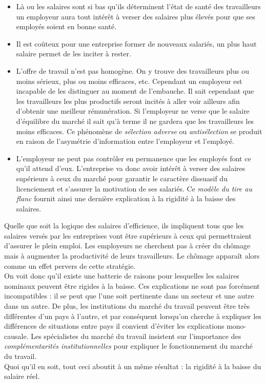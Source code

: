 \documentclass[10pt]{book}
\begin{document}
\begin{itemize}
  \item Là ou les salaires sont si bas qu'ils déterminent l'état de santé des travailleurs un employeur aura tout intérêt à verser des salaires plus élevés pour que ses employés soient en bonne santé.
  \item Il est coûteux pour une entreprise former de nouveaux salariés, un plus haut salaire permet de les inciter à rester.
  \item L'offre de travail n'est pas homogène. On y trouve des travailleurs plus ou moins sérieux, plus ou moins efficaces, etc. Cependant un employeur est incapable de les distinguer au moment de l'embauche. Il sait cependant que les travailleurs les plus productifs seront incités à aller voir ailleurs afin d'obtenir une meilleur rémunération. Si l'employeur ne verse que le salaire d'équilibre du marché il sait qu'à terme il ne gardera que les travailleurs les moins efficaces. Ce phénomène de \textit{sélection adverse} ou \textit{antisélection} se produit en raison de l'asymétrie d'information entre l'employeur et l'employé.
  \item L'employeur ne peut pas contrôler en permanence que les employés font ce qu'il attend d'eux. L'entreprise va donc avoir intérêt à verser des salaires supérieurs à ceux du marché pour garantir le caractère dissuasif du licenciement et s'assurer la motivation de ses salariés. Ce \textit{modèle du tire au flanc} fournit ainsi une dernière explication à la rigidité à la baisse des salaires.
\end{itemize}
Quelle que soit la logique des salaires d'efficience, ils impliquent tous que les salaires versés par les entreprises vont être supérieurs à ceux qui permettraient d'assurer le plein emploi. Les employeurs ne cherchent pas à créer du chômage mais à augmenter la productivité de leurs travailleurs. Le chômage apparaît alors comme un effet pervers de cette stratégie. \\
On voit donc qu'il existe une batterie de raisons pour lesquelles les salaires nominaux peuvent être rigides à la baisse. Ces explications ne sont pas forcément incompatibles : il se peut que l'une soit pertinente dans un secteur et une autre dans un autre. De plus, les institutions du marché du travail peuvent être très différentes d'un pays à l'autre, et par conséquent lorsqu'on cherche à expliquer les différences de situations entre pays il convient d'éviter les explications mono-causale. Les spécialistes du marché du travail insistent sur l'importance des \textit{complémentarités institutionnelles} pour expliquer le fonctionnement du marché du travail. \\
Quoi qu'il en soit, tout ceci aboutit à un même résultat : la rigidité à la baisse du salaire réel.
\end{document}
